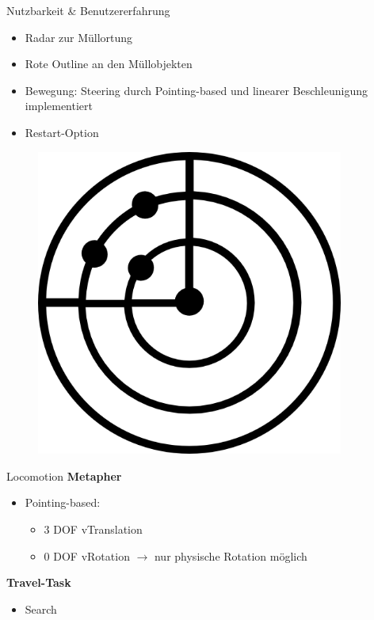 \documentclass{beamer}
\begin{document}
\begin{frame}{Nutzbarkeit \& Benutzererfahrung}
\begin{minipage}[c]{0.72\textwidth}
\begin{itemize}
\item Radar zur Müllortung
\item Rote Outline an den Müllobjekten
\item Bewegung: Steering durch Pointing-based und linearer Beschleunigung implementiert
\item Restart-Option
\end{itemize}
\end{minipage}
\hfill
\begin{minipage}[c]{0.25\textwidth}
\begin{figure}
\centering
\includegraphics[width=0.9\textwidth, keepaspectratio]{img/radar}
\caption{\cite{d}}
\end{figure}
\end{minipage}
\end{frame}

\begin{frame}{Locomotion}
\textbf{Metapher}
\begin{itemize}
\item Pointing-based:\begin{itemize}
\item 3 DOF vTranslation
\item 0 DOF vRotation $\rightarrow$ nur physische Rotation möglich
\end{itemize}
\end{itemize}
\textbf{Travel-Task}
\begin{itemize}
\item Search
\end{itemize}
\end{frame}
\end{document}
